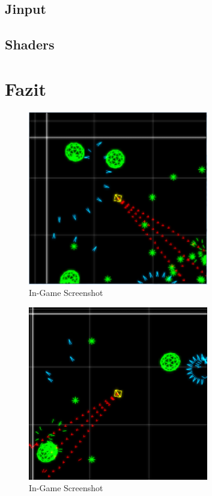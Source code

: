 \documentclass[a4paper]{article}
\begin{document}
\subsection{Jinput}
\subsection{Shaders}

\newpage
\section{Fazit}

\begin{figure}[H]
\centering
\includegraphics[width=0.7\textwidth]{screenshot1.png}
\caption{In-Game Screenshot}
\end{figure}

\begin{figure}[H]
\centering
\includegraphics[width=0.7\textwidth]{screenshot2.png}
\caption{In-Game Screenshot}
\end{figure}

\newpage
\nocite{pewpewgame}
\nocite{jinput}
\renewcommand{\refname}{Quellen}
\printbibliography

\listoffigures
\end{document}
